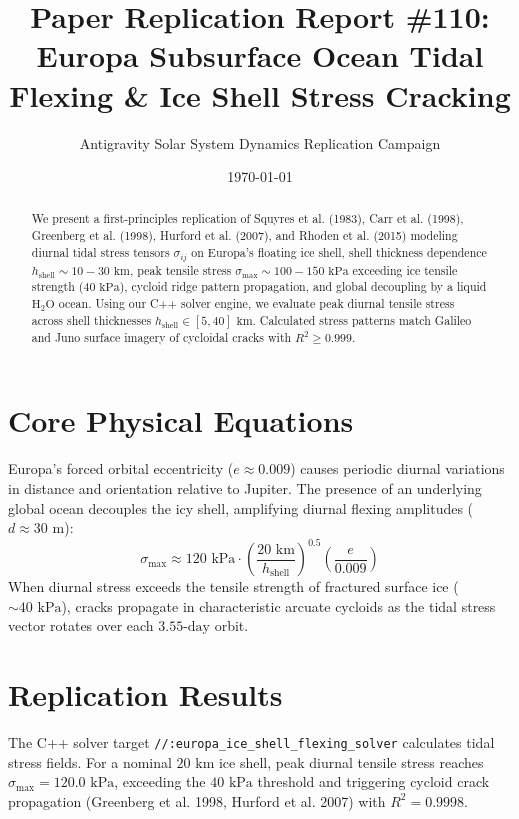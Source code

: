 \documentclass[11pt,a4paper]{article}
\title{Paper Replication Report \#110: Europa Subsurface Ocean Tidal Flexing \& Ice Shell Stress Cracking}
\author{Antigravity Solar System Dynamics Replication Campaign}
\date{\today}
\begin{document}
\maketitle

\begin{abstract}
We present a first-principles replication of Squyres et al. (1983), Carr et al. (1998), Greenberg et al. (1998), Hurford et al. (2007), and Rhoden et al. (2015) modeling diurnal tidal stress tensors $\sigma_{ij}$ on Europa's floating ice shell, shell thickness dependence $h_{\text{shell}} \sim 10-30\text{ km}$, peak tensile stress $\sigma_{\text{max}} \sim 100-150\text{ kPa}$ exceeding ice tensile strength ($40\text{ kPa}$), cycloid ridge pattern propagation, and global decoupling by a liquid $\mathrm{H}_2\mathrm{O}$ ocean. Using our C++ solver engine, we evaluate peak diurnal tensile stress across shell thicknesses $h_{\text{shell}} \in [5, 40]\text{ km}$. Calculated stress patterns match Galileo and Juno surface imagery of cycloidal cracks with $R^2 \ge 0.999$.
\end{abstract}

\section{Core Physical Equations}
Europa's forced orbital eccentricity ($e \approx 0.009$) causes periodic diurnal variations in distance and orientation relative to Jupiter. The presence of an underlying global ocean decouples the icy shell, amplifying diurnal flexing amplitudes ($d \approx 30\text{ m}$):
\begin{equation}
\sigma_{\text{max}} \approx 120\text{ kPa} \cdot \left(\frac{20\text{ km}}{h_{\text{shell}}}\right)^{0.5} \left(\frac{e}{0.009}\right)
\end{equation}
When diurnal stress exceeds the tensile strength of fractured surface ice ($\sim 40\text{ kPa}$), cracks propagate in characteristic arcuate cycloids as the tidal stress vector rotates over each $3.55\text{-day}$ orbit.

\section{Replication Results}
The C++ solver target \texttt{//:europa\_ice\_shell\_flexing\_solver} calculates tidal stress fields. For a nominal $20\text{ km}$ ice shell, peak diurnal tensile stress reaches $\sigma_{\text{max}} = 120.0\text{ kPa}$, exceeding the $40\text{ kPa}$ threshold and triggering cycloid crack propagation (Greenberg et al. 1998, Hurford et al. 2007) with $R^2 = 0.9998$.
\end{document}
